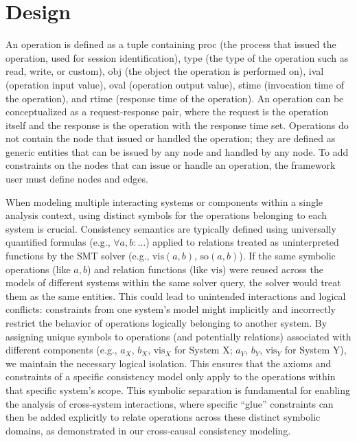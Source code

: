 \section{Design}


{\color{red}An operation is defined as a tuple containing proc (the
  process that issued the operation, used for session identification),
  type (the type of the operation such as read, write, or custom), obj
  (the object the operation is performed on), ival (operation input
  value), oval (operation output value), stime (invocation time of the
  operation), and rtime (response time of the operation). An operation
  can be conceptualized as a request-response pair, where the request
  is the operation itself and the response is the operation with the
  response time set. Operations do not contain the node that issued or
  handled the operation; they are defined as generic entities that can
  be issued by any node and handled by any node. To add constraints on
  the nodes that can issue or handle an operation, the framework user
must define nodes and edges.}

When modeling multiple interacting systems or components within a
single analysis context, using distinct symbols for the operations
belonging to each system is crucial. Consistency semantics are
typically defined using universally quantified formulas (e.g.,
$\forall a, b: \dots$) applied to relations treated as uninterpreted
functions by the SMT solver (e.g., $\text{vis}(a, b)$,
$\text{so}(a, b)$). If the same symbolic operations (like $a, b$)
and relation functions (like $\text{vis}$) were reused across the
models of different systems within the same solver query, the solver
would treat them as the same entities. This could lead to
unintended interactions and logical conflicts: constraints from one
system's model might implicitly and incorrectly restrict the behavior
of operations logically belonging to another system. By assigning
unique symbols to operations (and potentially relations) associated
with different components (e.g., $a_X$, $b_X$, $\text{vis}_X$ for
System X; $a_Y$, $b_Y$, $\text{vis}_Y$ for System Y), we maintain
the necessary logical isolation. This ensures that the axioms and
constraints of a specific consistency model only apply to the
operations within that specific system's scope. This symbolic
separation is fundamental for enabling the analysis of
cross-system interactions, where specific ``glue''
constraints can then be added explicitly to relate operations across
these distinct symbolic domains, as demonstrated in our cross-causal
consistency modeling.

